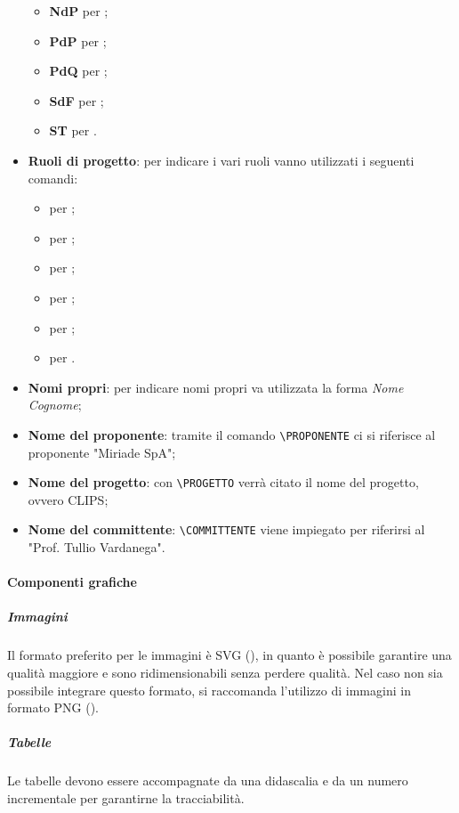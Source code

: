 \begin{itemize}
\begin{itemize}
				\item \textbf{NdP} per \NPdoc;
				\item \textbf{PdP} per \PPdoc;
				\item \textbf{PdQ} per \PQdoc;
				\item \textbf{SdF} per \SFdoc;
				\item \textbf{ST} per \STdoc.
			\end{itemize}	
			\item \textbf{Ruoli di progetto}: per indicare i vari ruoli vanno utilizzati i seguenti comandi:
			\begin{itemize}
				\item {} per \AM;
				\item {} per \AN;
				\item {} per \PR;
				\item {} per \PRJ;
				\item {} per \RES;
				\item {} per \VER.
			\end{itemize}
			\item \textbf{Nomi propri}: per indicare nomi propri va utilizzata la forma \textit{Nome Cognome};
			\item \textbf{Nome del proponente}: tramite il comando \texttt{\textbackslash PROPONENTE} ci si riferisce al proponente "Miriade SpA";
			\item \textbf{Nome del progetto}: con \texttt{\textbackslash PROGETTO} verrà citato il nome del progetto, ovvero CLIPS;
			\item \textbf{Nome del committente}: \texttt{\textbackslash COMMITTENTE} viene impiegato per riferirsi al "Prof. Tullio Vardanega".
		\end{itemize}
		
		\paragraph{Componenti grafiche}		
			\subparagraph{Immagini}
			Il formato preferito per le immagini è SVG (), in quanto è possibile garantire una qualità maggiore e sono ridimensionabili senza perdere qualità. Nel caso non sia possibile integrare questo formato, si raccomanda l'utilizzo di immagini in formato PNG ().
			\subparagraph{Tabelle}
			Le tabelle devono essere accompagnate da una didascalia e da un numero incrementale per garantirne la tracciabilità.
		
